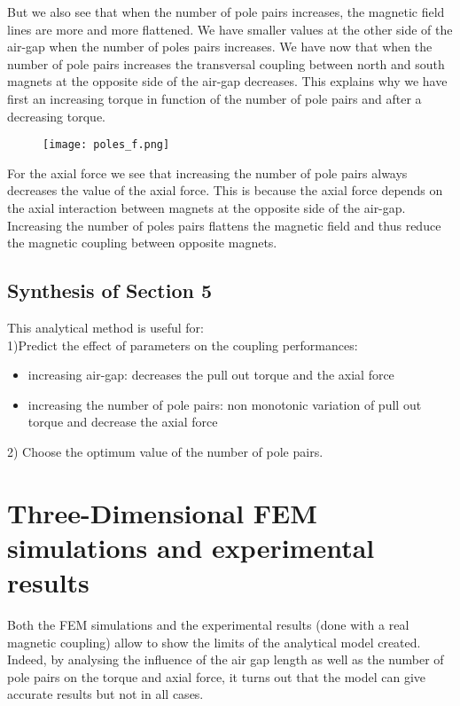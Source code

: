 But we also see that when the number of pole pairs increases, the magnetic field lines are more and more flattened. We have smaller values at the other side of the air-gap when the number of poles pairs increases. We have now that when the number of pole pairs increases the transversal coupling between north and south magnets at the opposite side of the air-gap decreases. 
This explains why we have first an increasing torque in function of the number of pole pairs and after a decreasing torque.
\begin{figure}[H]
    \centering
    \texttt{[image: poles\_f.png]}
\end{figure}
For the axial force we see that increasing the number of pole pairs always decreases the value of the axial force. This is because the axial force depends on the axial interaction between magnets at the opposite side of the air-gap. Increasing the number of poles pairs flattens the magnetic field and thus reduce the magnetic coupling between opposite magnets.

\subsection*{Synthesis of Section 5}
This analytical method is useful for:\\
1)Predict the effect of parameters on the coupling performances: 
\begin{itemize}
    \item 	increasing air-gap: decreases the pull out torque and the axial force
    \item increasing the number of pole pairs: non monotonic variation of pull out torque and decrease the axial force
\end{itemize}
2) Choose the optimum value of the number of pole pairs.


\section{Three-Dimensional FEM simulations and experimental results}

Both the FEM simulations and the experimental results (done with a real magnetic coupling) allow to show the limits of the analytical model created. Indeed, by analysing the influence of the air gap length as well as the number of pole pairs on the torque and axial force, it turns out that the model can give accurate results but not in all cases.

\bigskip

